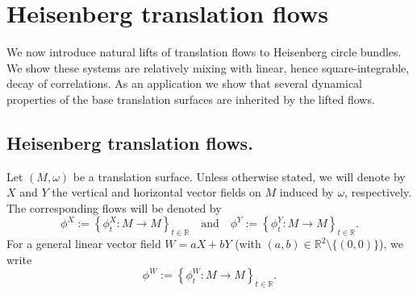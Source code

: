 \documentclass{amsart}
\theoremstyle{definition}
\theoremstyle{remark}
\newtheorem{remark}[theorem]{Remark}
\numberwithin{equation}{section}
\newcommand{\<}{{\langle}}
\renewcommand{\>}{{\rangle}}
\newcommand{\field}[1]{\mathbb{#1}}
\newcommand{\R}{\field{R}}
\begin{document}

\section{Heisenberg translation flows}\label{sec:heisenberg:flow}

We now introduce natural lifts of translation flows to Heisenberg circle bundles. We show these systems are relatively mixing with linear, hence square-integrable, decay of correlations. As an application we show that several dynamical properties of the base translation surfaces are inherited by the lifted flows. 

\subsection{Heisenberg translation flows.} Let $(M,\omega)$ be a translation surface. Unless otherwise stated, we will denote by $X$ and $Y$ the vertical and horizontal vector fields on $M$ induced by $\omega$, respectively. The corresponding flows will be denoted by
\[
\phi^X := \left\lbrace \phi^X_t \colon M \to M \right\rbrace_{t \in \mathbb{R}} \quad \text{and} \quad \phi^Y := \left\lbrace \phi^Y_t \colon M \to M \right\rbrace_{t \in \mathbb{R}}.
\]
For a general linear vector field $W = aX+bY$ (with $(a,b) \in \R^2\setminus \{(0,0)\}$), we write \[
\phi^W := \left\lbrace \phi^W_t \colon M \to M \right\rbrace_{t \in \mathbb{R}}.
\]
\end{document}
